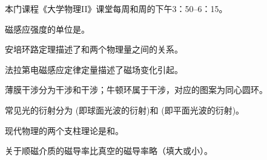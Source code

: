 \documentclass{njustexam}
\begin{document}
\begin{problem} 
  本门课程《大学物理II》课堂每周和周的下午3：50--6：15。
\end{problem} 


\begin{problem}
磁感应强度的单位是。
\end{problem}


\begin{problem}
  安培环路定理描述了和两个物理量之间的关系。
\end{problem}


\begin{problem}
  法拉第电磁感应定律定量描述了磁场变化引起。
\end{problem}

\begin{problem}
薄膜干涉分为干涉和干涉；牛顿环属于干涉，对应的图案为同心圆环。
\end{problem}

\begin{problem}
  常见光的衍射分为 (即球面光波的衍射)和 (即平面光波的衍射)。
 \end{problem}

 \begin{problem}
  现代物理的两个支柱理论是和。
\end{problem}




  \begin{problem}

    关于顺磁介质的磁导率比真空的磁导率略（填大或小）。
\end{problem}
\end{document}
